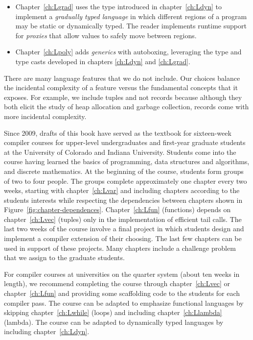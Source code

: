 \documentclass[7x10]{TimesAPriori_MIT}%
\def\pythonEd{1}
\def\edition{1}
\newcommand{\pythonColor}[0]{}
\newcommand{\python}[1]{{\if\edition\pythonEd\pythonColor #1\fi}}
\numberwithin{theorem}{chapter}
\numberwithin{definition}{chapter}
\numberwithin{equation}{chapter}
\begin{document}
\begin{itemize}
\item Chapter~\ref{ch:Lgrad} uses the  type introduced in
  chapter~\ref{ch:Ldyn} to implement a \emph{gradually typed language}
  in which different regions of a program may be static or dynamically
  typed. The reader implements runtime support for \emph{proxies} that
  allow values to safely move between regions.
\item Chapter~\ref{ch:Lpoly} adds \emph{generics} with autoboxing,
  leveraging the  type and type casts developed in chapters
  \ref{ch:Ldyn} and \ref{ch:Lgrad}.
\end{itemize}

There are many language features that we do not include. Our choices
balance the incidental complexity of a feature versus the fundamental
concepts that it exposes. For example, we include tuples and not
records because although they both elicit the study of heap allocation and
garbage collection, records come with more incidental complexity.

Since 2009, drafts of this book have served as the textbook for
sixteen-week compiler courses for upper-level undergraduates and
first-year graduate students at the University of Colorado and Indiana
University.
%
Students come into the course having learned the basics of
programming, data structures and algorithms, and discrete
mathematics.
%
At the beginning of the course, students form groups of two to four
people.  The groups complete approximately one chapter every two
weeks, starting with chapter~\ref{ch:Lvar} and including chapters
according to the students interests while respecting the dependencies
between chapters shown in
Figure~\ref{fig:chapter-dependences}. Chapter~\ref{ch:Lfun}
(functions) depends on chapter~\ref{ch:Lvec} (tuples) only in the
implementation of efficient tail calls.
%
The last two weeks of the course involve a final project in which
students design and implement a compiler extension of their choosing.
The last few chapters can be used in support of these projects.  Many
chapters include a challenge problem that we assign to the graduate
students.

For compiler courses at universities on the quarter system
(about ten weeks in length), we recommend completing the course
through chapter~\ref{ch:Lvec} or chapter~\ref{ch:Lfun} and providing
some scaffolding code to the students for each compiler pass.
%
The course can be adapted to emphasize functional languages by
skipping chapter~\ref{ch:Lwhile} (loops) and including
chapter~\ref{ch:Llambda} (lambda). The course can be adapted to
dynamically typed languages by including chapter~\ref{ch:Ldyn}.
%
\end{document}
